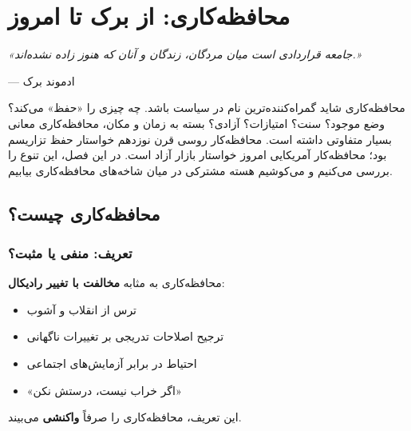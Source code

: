 
\chapter{محافظه‌کاری: از برک تا امروز}
\label{ch:conservatism}

\begin{flushright}
\textit{«جامعه قراردادی است میان مردگان، زندگان و آنان که هنوز زاده نشده‌اند.»}

— ادموند برک
\end{flushright}


\lettrine[lines=3, lraise=0.1, nindent=0.5em]{\textcolor{RightBlue}{م}}{حافظه‌کاری} 
شاید گمراه‌کننده‌ترین نام در سیاست باشد. چه چیزی را «حفظ» می‌کند؟ وضع موجود؟ سنت؟ امتیازات؟ آزادی؟ بسته به زمان و مکان، محافظه‌کاری معانی بسیار متفاوتی داشته است. محافظه‌کار روسی قرن نوزدهم خواستار حفظ تزاریسم بود؛ محافظه‌کار آمریکایی امروز خواستار بازار آزاد است. در این فصل، این تنوع را بررسی می‌کنیم و می‌کوشیم هسته مشترکی در میان شاخه‌های محافظه‌کاری بیابیم.

\section{محافظه‌کاری چیست؟}

\subsection{تعریف: منفی یا مثبت؟}

\begin{defbox}
محافظه‌کاری به مثابه \textbf{مخالفت با تغییر رادیکال}:
\begin{itemize}[nosep]
    \item ترس از انقلاب و آشوب
    \item ترجیح اصلاحات تدریجی بر تغییرات ناگهانی
    \item احتیاط در برابر آزمایش‌های اجتماعی
    \item «اگر خراب نیست، درستش نکن»
\end{itemize}
این تعریف، محافظه‌کاری را صرفاً \textbf{واکنشی} می‌بیند.
\end{defbox}

